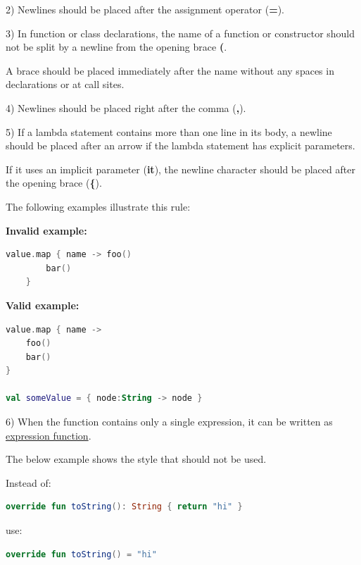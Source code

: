 2)	Newlines should be placed after the assignment operator (\textbf{=}).

3)	In function or class declarations, the name of a function or constructor should not be split by a newline from the opening brace \textbf{(}.

    A brace should be placed immediately after the name without any spaces in declarations or at call sites.

4)	Newlines should be placed right after the comma (\textbf{,}).

5)	If a lambda statement contains more than one line in its body, a newline should be placed after an arrow if the lambda statement has explicit parameters.

    If it uses an implicit parameter (\textbf{it}), the newline character should be placed after the opening brace (\textbf{\{}). 

    The following examples illustrate this rule:





\textbf{Invalid example:}

\begin{lstlisting}[language=Kotlin]
    value.map { name -> foo()
        bar()
    }
\end{lstlisting}


\textbf{Valid example:} 

\begin{lstlisting}[language=Kotlin]
value.map { name ->
    foo()
    bar()
}

val someValue = { node:String -> node }
\end{lstlisting}


6) When the function contains only a single expression, it can be written as \href{https://kotlinlang.org/docs/reference/functions.html#single-expression-functions}{expression function}. 

   The below example shows the style that should not be used.

   

Instead of: 

\begin{lstlisting}[language=Kotlin]
override fun toString(): String { return "hi" }
\end{lstlisting}
use:

\begin{lstlisting}[language=Kotlin]
override fun toString() = "hi"
\end{lstlisting}


